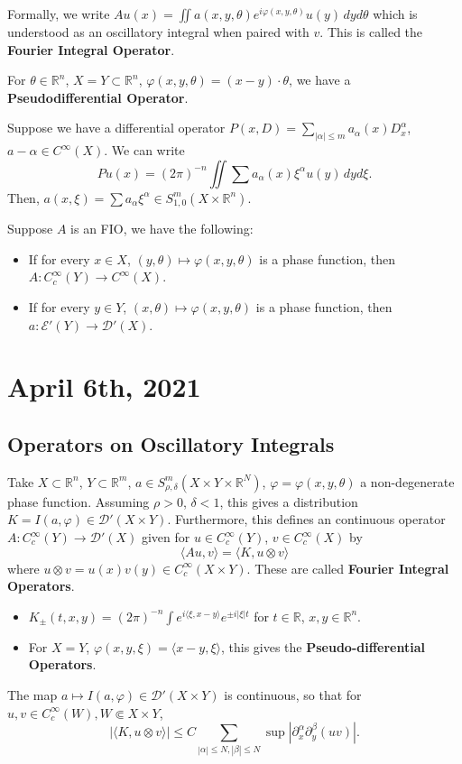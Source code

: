 \documentclass[12pt]{scrartcl}
\newcommand{\R}{\mathbb{R}}
\newcommand{\<}{\langle}
\renewcommand{\>}{\rangle}
\let \phi \varphi
\let \mc \mathcal
\let \tensor \otimes
\begin{document}
Formally, we write $Au(x) = \iint a(x, y, \theta) e^{i\phi(x, y, \theta)} u(y)\,dy d\theta$ which is understood as an oscillatory integral when paired with $v$.  This is called the \textbf{Fourier Integral Operator}.

For $\theta \in \R^n$, $X = Y \subset \R^n$, $\phi(x, y, \theta) = (x - y) \cdot \theta$, we have a \textbf{Pseudodifferential Operator}.

Suppose we have a differential operator $P(x, D) = \sum_{|\alpha| \le m} a_\alpha(x) D_x^\alpha$, $a-\alpha \in C^\infty(X)$.  We can write
$$Pu(x) = (2\pi)^{-n} \iint \sum a_\alpha(x) \xi^\alpha u(y) \,dy d\xi.$$
Then, $a(x, \xi) = \sum a_\alpha \xi^\alpha \in S_{1, 0}^m(X \times \R^n)$. 
 
\begin{theorem}
Suppose $A$ is an FIO, we have the following:
\begin{itemize}
\item If for every $x \in X$, $(y, \theta) \mapsto \phi(x, y, \theta)$ is a phase function, then $A: C_c^\infty(Y) \to C^\infty(X)$.
\item If for every $y \in Y$, $(x, \theta) \mapsto \phi(x, y, \theta)$ is a phase function, then $a: \mc E'(Y) \to \mc D'(X)$.
\end{itemize}
\end{theorem}
\pagebreak
\section{April 6th, 2021}
\subsection{Operators on Oscillatory Integrals}
Take $X \subset \R^n$, $Y \subset \R^m$, $a \in S_{\rho, \delta}^m(X \times Y \times \R^N)$, $\phi = \phi(x, y, \theta)$ a non-degenerate phase function.  Assuming $\rho > 0$, $\delta < 1$, this gives a distribution $K = I(a, \phi) \in \mc D'(X \times Y)$.  Furthermore, this defines an continuous operator $A: C_c^\infty(Y) \to \mc D'(X)$ given for $u \in C_c^\infty(Y)$, $v \in C_c^\infty(X)$ by
$$\<Au, v\> = \<K, u \otimes v\>$$
where $u \tensor v = u(x)v(y) \in C_c^\infty(X \times Y).$  These are called \textbf{Fourier Integral Operators}. 
\begin{itemize}
\item $K_\pm(t, x, y) = (2\pi)^{-n} \int e^{i \<\xi, x-y\>} e^{\pm i|\xi| t}$ for $t \in \R$, $x, y\in \R^n$.
\item For $X = Y$, $\phi(x, y, \xi) = \<x-y, \xi\>$, this gives the \textbf{Pseudo-differential Operators}.  
\end{itemize}
\begin{remark} The map $a \mapsto I(a, \phi) \in \mc D'(X \times Y)$ is continuous, so that for $u, v \in C_c^\infty(W), W \Subset X \times Y$,
$$|\<K, u \tensor v\>| \le C \sum_{|\alpha| \le N, |\beta|\le N} \sup |\partial_x^\alpha \partial_y^\beta (uv)|.$$
\end{remark}
\end{document}
